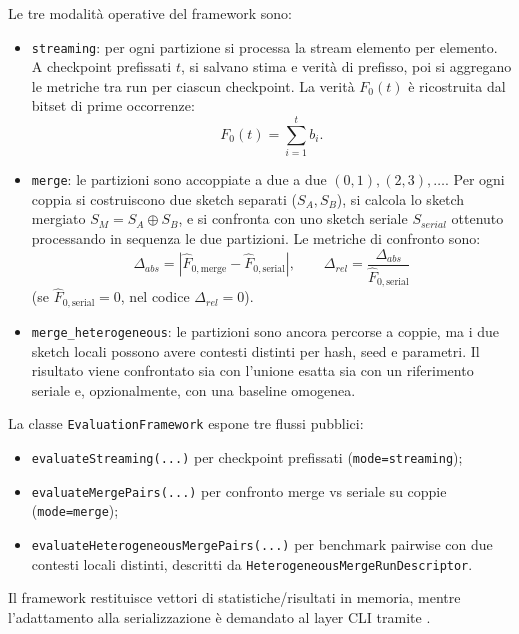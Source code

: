 Le tre modalità operative del framework sono:

\begin{itemize}
    \item \texttt{streaming}: per ogni partizione si processa la stream elemento
    per elemento. A checkpoint prefissati \(t\), si salvano stima e verità di
    prefisso, poi si aggregano le metriche tra run per ciascun checkpoint.
    La verità \(F_0(t)\) è ricostruita dal bitset di prime occorrenze:
    \[
    F_0(t)=\sum_{i=1}^{t} b_i.
    \]

	    \item \texttt{merge}: le partizioni sono accoppiate a due a due
	    \((0,1),(2,3),\dots\).
	    Per ogni coppia si costruiscono due sketch separati (\(S_A, S_B\)),
	    si calcola lo sketch mergiato \(S_M = S_A \oplus S_B\), e si confronta con
	    uno sketch seriale \(S_{serial}\) ottenuto processando in sequenza le due
    partizioni. Le metriche di confronto sono:
    \[
    \Delta_{abs} = \left| \hat{F}_{0,\text{merge}} - \hat{F}_{0,\text{serial}} \right|,
    \qquad
	    \Delta_{rel} = \frac{\Delta_{abs}}{\hat{F}_{0,\text{serial}}}
	    \]
	    (se \(\hat{F}_{0,\text{serial}}=0\), nel codice \(\Delta_{rel}=0\)).

	    \item \texttt{merge\_heterogeneous}: le partizioni sono ancora percorse a
	    coppie, ma i due sketch locali possono avere contesti distinti per hash,
	    seed e parametri. Il risultato viene confrontato sia con l'unione esatta
	    sia con un riferimento seriale e, opzionalmente, con una baseline
	    omogenea.
	\end{itemize}

La classe \texttt{EvaluationFramework} espone tre flussi pubblici:
\begin{itemize}
    \item \texttt{evaluateStreaming(...)} per checkpoint prefissati
    (\texttt{mode=streaming});
    \item \texttt{evaluateMergePairs(...)} per confronto merge vs seriale su coppie
    (\texttt{mode=merge});
    \item \texttt{evaluateHeterogeneousMergePairs(...)} per benchmark pairwise
    con due contesti locali distinti, descritti da
    \texttt{HeterogeneousMergeRunDescriptor}.
\end{itemize}
Il framework
restituisce vettori di statistiche/risultati in memoria, mentre l'adattamento
alla serializzazione è demandato al layer CLI tramite .

